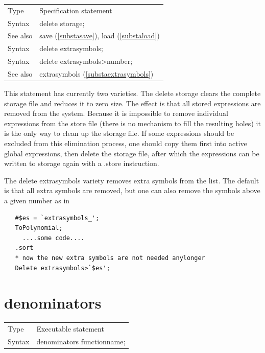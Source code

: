 \noindent \begin{tabular}{ll}
Type & Specification statement\\
Syntax & delete storage; \\
See also & save (\ref{substasave}), load (\ref{substaload}) \\
Syntax & delete extrasymbols; \\
Syntax & delete extrasymbols\textgreater{}number; \\
See also & extrasymbols (\ref{substaextrasymbols}) \\

\end{tabular} \vspace{4mm}

\noindent This statement has currently two varieties. The delete 
storage clears the complete storage 
file and reduces it to zero size. The effect is that 
all stored expressions are removed from the system. Because it is 
impossible to remove individual expressions from the store file (there is 
no mechanism to fill the resulting holes) it is the only way to clean up 
the storage file. If some expressions should be excluded from this 
elimination process, one should copy them first into active global 
expressions, then delete the storage file, after which the expressions can 
be written to storage again with a .store instruction.

\noindent The delete extrasymbols\index{} variety removes 
extra symbols from the list. The default is that all 
extra symbols are removed, but one can also remove the symbols above a 
given number as in
\begin{verbatim}
   #$es = `extrasymbols_';
   ToPolynomial;
     ....some code....
   .sort
   * now the new extra symbols are not needed anylonger
   Delete extrasymbols>`$es';
\end{verbatim}
\vspace{10mm}


\section{denominators}
\label{substadenominators}

\noindent \begin{tabular}{ll}
Type & Executable statement\\
Syntax & denominators functionname;
\end{tabular} \vspace{4mm}

